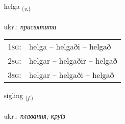 \documentclass[frontgrid, backgrid]{flacards}\usepackage[]{graphicx}\usepackage[]{xcolor}
\begin{document}
\renewcommand{\flhead}{\vskip5pt \fboxsep=0pt {\small\bfseries\footnotesize Sagnorð | дієслово}}
\renewcommand{\fcfoot}{\vskip5pt \fboxsep=0pt \hspace{2pt}{\small\bfseries\footnotesize 3K}}

\renewcommand{\blhead}{\vskip5pt {\small\bfseries\footnotesize Sagnorð | дієслово }}
\renewcommand{\bcfoot}{\vskip5pt \hspace{2pt}{\small\bfseries\footnotesize 3K}}


{helga \small{\textsubscript{(\textit{v.})}} \\[1ex] %
\textphonetic{[hɛlka]} \\
ukr.: \emph{присвятити} \\  [2ex]
\renewcommand*{\arraystretch}{0.8}
\begin{tabular}{p{1cm}l}
\textsc{1sg}: & helga -- helgaði -- helgað \\ 
\textsc{2sg}: & helgar -- helgaðir -- helgað \\ 
\textsc{3sg}: & helgar -- helgaði -- helgað \\ 
\end{tabular}
}

\renewcommand{\flhead}{\vskip5pt \fboxsep=0pt {\small\bfseries\footnotesize Nafnorð | іменник}}
\renewcommand{\fcfoot}{\vskip5pt \fboxsep=0pt \hspace{2pt}{\small\bfseries\footnotesize 3K}}

\renewcommand{\blhead}{\vskip5pt {\small\bfseries\footnotesize Nafnorð | іменник }}
\renewcommand{\bcfoot}{\vskip5pt \hspace{2pt}{\small\bfseries\footnotesize 3K}}


{sigling \small{\textsubscript{(\textit{f.})}} \\[1ex] %
\textphonetic{[sɪkliŋk]} \\
ukr.: \emph{плавання; круїз} \\  [2ex]
\renewcommand*{\arraystretch}{0.8}
}
\end{document}
